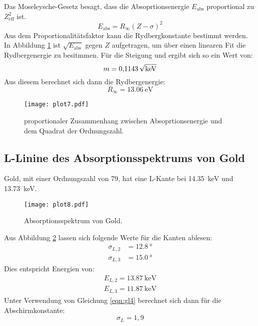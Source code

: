 Das Moseleysche-Gesetz besagt, dass die Absoprtionsenergie $E_\text{abs}$ proportional zu $Z_\text{eff}^2$ ist.
\begin{equation}
  E_\text{abs} = R_\infty (Z-\sigma)^2
\end{equation}
Aus dem Proportionalitätsfaktor kann die Rydbergkonstante bestimmt werden.
In Abbildung \ref{fig:plot7} ist $\sqrt{E_\text{abs}}$ gegen $Z$ aufgetragen, um über einen linearen Fit die Rydbergenergie zu besitmmen.
Für die Steigung und ergibt sich so ein Wert von:
\begin{equation*}
  m = \SI{0.1143}{\sqrt{\kilo\eV}}
\end{equation*}
Aus diesem berechnet sich dann die Rydbergenergie:
\begin{equation*}
  R_\infty = \SI{13.06}{\eV}
\end{equation*}
\begin{figure}
  \centering
  \texttt{[image: plot7.pdf]}
  \caption{proportionaler Zusammenhang zwischen Absoprtionsenergie und dem Quadrat der Ordnungszahl.}
  \label{fig:plot7}
\end{figure}
\FloatBarrier

\subsection{L-Linine des Absorptionsspektrums von Gold}

Gold, mit einer Ordnungszahl von 79, hat eine L-Kante bei \SI{14.35}{\kilo\eV} und \SI{13.73}{\kilo\eV}.
\begin{figure}
  \centering
  \texttt{[image: plot8.pdf]}
  \caption{Absorptionsspektrum von Gold.}
  \label{fig:plot8}
\end{figure}
Aus Abbildung \ref{fig:plot8} lassen sich folgende Werte für die Kanten ablesen:
\begin{align*}
  \sigma_{L,2} &= \SI{12.8}{\degree}\\
  \sigma_{L,3} &= \SI{15.0}{\degree}
\end{align*}
Dies entspricht Energien von:
\begin{align*}
  E_{L,2} = \SI{13.87}{\kilo\eV} \\
  E_{L,3} = \SI{11,87}{\kilo\eV}
\end{align*}
Unter Verwendung von Gleichung \eqref{eqn:gl4} berechnet sich dann für die Abschirmkonstante:
\begin{equation*}
  \sigma_L = 1,9
\end{equation*}

